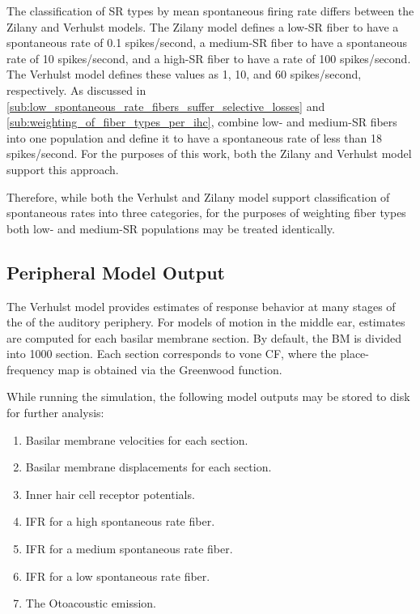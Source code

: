 The classification of SR types by mean spontaneous firing rate differs between the Zilany and Verhulst models.  The Zilany model defines a low-SR fiber to have a spontaneous rate of 0.1 spikes/second, a medium-SR fiber to have a spontaneous rate of 10 spikes/second, and a high-SR fiber to have a rate of 100 spikes/second.  The Verhulst model defines these values as 1, 10, and 60 spikes/second, respectively.  As discussed in \autoref{sub:low_spontaneous_rate_fibers_suffer_selective_losses} and \autoref{sub:weighting_of_fiber_types_per_ihc}, \citeauthor{Temchin2008Threshold} combine low- and medium-SR fibers into one population and define it to have a spontaneous rate of less than 18 spikes/second.  For the purposes of this work, both the Zilany and Verhulst model support this approach.  

Therefore, while both the Verhulst and Zilany model support classification of spontaneous rates into three categories, for the purposes of weighting fiber types both low- and medium-SR populations may be treated identically.  


\subsection{Peripheral Model Output} %
\label{sub:peripheral_model_output}
The Verhulst model provides estimates of response behavior at many stages of the of the auditory periphery.   For models of motion in the middle ear, estimates are computed for each basilar membrane section.  By default, the BM is divided into 1000 section.  Each section corresponds to vone CF, where the place-frequency map is obtained via the Greenwood function.

 While running the simulation, the following model outputs may be stored to disk for further analysis: 
\begin{enumerate}
	\item Basilar membrane velocities for each section.
	\item Basilar membrane displacements for each section.
	\item Inner hair cell receptor potentials. 
	\item IFR for a high spontaneous rate fiber.
	\item IFR for a medium spontaneous rate fiber.
	\item IFR for a low spontaneous rate fiber. 
	\item The Otoacoustic emission. 
\end{enumerate}

